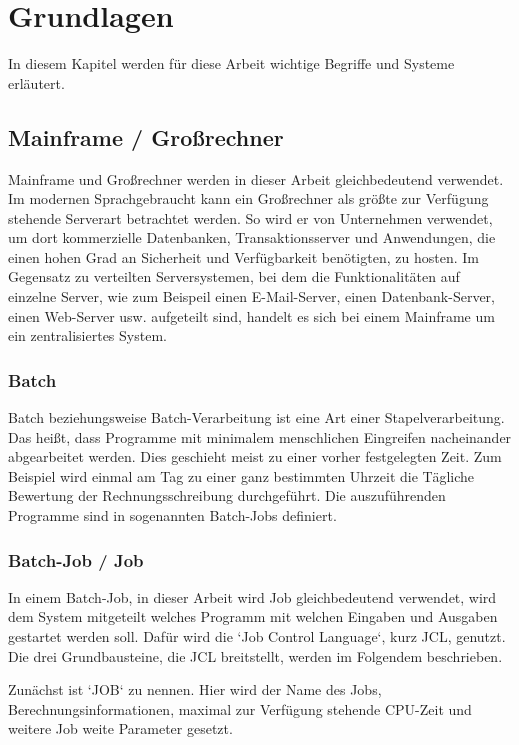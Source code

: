 \chapter{Grundlagen}\label{ch:grundlagen}
In diesem Kapitel werden für diese Arbeit wichtige Begriffe und Systeme erläutert.

\section{Mainframe / Großrechner}
Mainframe und Großrechner werden in dieser Arbeit gleichbedeutend verwendet.
Im modernen Sprachgebraucht kann ein Großrechner als größte zur Verfügung stehende Serverart betrachtet werden.
So wird er von Unternehmen verwendet, um dort kommerzielle Datenbanken, Transaktionsserver und Anwendungen, die einen hohen Grad an Sicherheit und Verfügbarkeit benötigten, zu hosten.
Im Gegensatz zu verteilten Serversystemen, bei dem die Funktionalitäten auf einzelne Server, wie zum Beispeil einen E-Mail-Server, einen Datenbank-Server, einen Web-Server usw. aufgeteilt sind, handelt es sich bei einem Mainframe um ein zentralisiertes System.
\cite{Ebbers.2011}

\subsection{Batch}
Batch beziehungsweise Batch-Verarbeitung ist eine Art einer Stapelverarbeitung.
Das heißt, dass Programme mit minimalem menschlichen Eingreifen nacheinander abgearbeitet werden.
Dies geschieht meist zu einer vorher festgelegten Zeit.
Zum Beispiel wird einmal am Tag zu einer ganz bestimmten Uhrzeit die Tägliche Bewertung der Rechnungsschreibung durchgeführt.
Die auszuführenden Programme sind in sogenannten Batch-Jobs definiert. 
\cite{Ebbers.2011}

\subsection{Batch-Job / Job}
In einem Batch-Job, in dieser Arbeit wird Job gleichbedeutend verwendet, wird dem System mitgeteilt welches Programm mit welchen Eingaben und Ausgaben gestartet werden soll.
Dafür wird die `Job Control Language`, kurz JCL, genutzt.
Die drei Grundbausteine, die JCL breitstellt, werden im Folgendem beschrieben.

Zunächst ist `JOB` zu nennen.
Hier wird der Name des Jobs, Berechnungsinformationen, maximal zur Verfügung stehende CPU-Zeit und weitere Job weite Parameter gesetzt.

